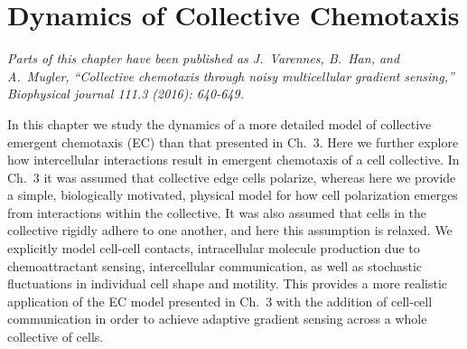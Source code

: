 
\chapter{Dynamics of Collective Chemotaxis}

\textit{Parts of this chapter have been published as J.\ Varennes, B.\ Han, and A.\ Mugler, ``Collective chemotaxis through noisy multicellular gradient sensing,'' Biophysical journal 111.3 (2016): 640-649.}
\vspace{5mm}

\noindent
In this chapter we study the dynamics of a more detailed model of collective emergent chemotaxis (EC) than that presented in Ch.\ 3.
Here we further explore how intercellular interactions result in emergent chemotaxis of a cell collective. In Ch.\ 3 it was assumed that collective edge cells polarize, whereas here we provide a simple, biologically motivated, physical model for how cell polarization emerges from interactions within the collective. It was also assumed that cells in the collective rigidly adhere to one another, and here this assumption is relaxed. We explicitly model cell-cell contacts, intracellular molecule production due to chemoattractant sensing, intercellular communication, as well as stochastic fluctuations in individual cell shape and motility.
This provides a more realistic application of the EC model presented in Ch.\ 3 with the addition of cell-cell communication in order to achieve adaptive gradient sensing across a whole collective of cells.

